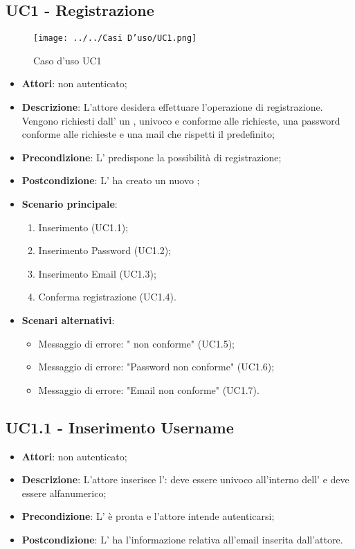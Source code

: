 \subsection{UC1 - Registrazione}
\label{ssec:UC1}
\begin{figure}[h!]
\centering
\texttt{[image: ../../Casi D'uso/UC1.png]}
\caption{Caso d'uso UC1}
 \end{figure}
\begin{itemize}
\item \textbf{Attori}:  non autenticato;
\item \textbf{Descrizione}: L'attore desidera effettuare l'operazione di registrazione. Vengono richiesti dall' un , univoco e conforme alle richieste, una password conforme alle richieste e una mail che rispetti il  predefinito;
\item \textbf{Precondizione}: L' predispone la possibilità di registrazione;
\item \textbf{Postcondizione}: L' ha creato un nuovo  ;
\item \textbf{Scenario principale}: \begin{enumerate}\item Inserimento  (UC1.1);\item Inserimento Password (UC1.2);\item Inserimento Email (UC1.3);\item Conferma registrazione (UC1.4).
\end{enumerate}
\item \textbf{Scenari alternativi}:
	\begin{itemize}
	\item Messaggio di errore: " non conforme" (UC1.5);\item Messaggio di errore: "Password non conforme" (UC1.6);\item Messaggio di errore: "Email non conforme" (UC1.7).
	\end{itemize}
\end{itemize}
\subsection{UC1.1 - Inserimento Username}
\label{ssec:UC1.1}
\begin{itemize}
\item \textbf{Attori}:  non autenticato;
\item \textbf{Descrizione}: L’attore inserisce l': deve essere univoco all'interno dell' e deve essere alfanumerico;
\item \textbf{Precondizione}: L' è pronta e l'attore intende autenticarsi;
\item \textbf{Postcondizione}: L' ha l’informazione relativa all'email inserita dall’attore.
\end{itemize}
